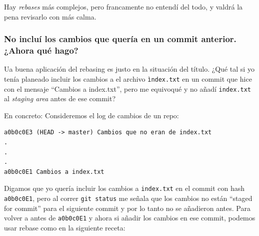 \documentclass[spanish, 12pt, a4paper]{article}
\begin{document}
Hay \emph{rebases} más complejos, pero francamente no entendí del todo,
y valdrá la pena revisarlo con más calma.

\subsubsection{No incluí los cambios que quería en un commit anterior.
¿Ahora qué hago?}

Ua buena aplicación del rebasing es justo en la situación del título.
¿Qué tal si yo tenía planeado incluir los cambios a el archivo
\passthrough{\lstinline!ìndex.txt!} en un commit que hice con el mensaje
``Cambios a index.txt'', pero me equivoqué y no añadí
\passthrough{\lstinline!index.txt!} al \emph{staging area} antes de ese
commit?

En concreto: Consideremos el log de cambios de un repo:

\begin{lstlisting}
a0b0c0E3 (HEAD -> master) Cambios que no eran de index.txt
.
.
.
a0b0c0E1 Cambios a index.txt
\end{lstlisting}

Digamos que yo quería incluir los cambios a
\passthrough{\lstinline!index.txt!} en el commit con hash
\passthrough{\lstinline!a0b0c0E1!}, pero al correr
\passthrough{\lstinline!git status!} me señala que los cambios no están
``staged for commit'' para el siguiente commit y por lo tanto no se
añadieron antes. Para volver a antes de
\passthrough{\lstinline!a0b0c0E1!} y ahora si añadir los cambios en ese
commit, podemos usar rebase como en la siguiente receta:
\end{document}
